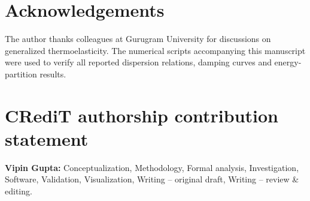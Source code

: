 \documentclass[review,12pt]{elsarticle}
\begin{document}
\label{sec:intro_ref}
\label{sec:history_ref}
\label{sec:foundations_ref}
\label{sec:prelim_ref}
\label{sec:kinetic_ref}
\label{sec:classical_ref}
\label{sec:hyperbolic_ref}
\label{sec:lags_ref}
\label{sec:delayfid_ref}
\label{sec:memory_ref}
\label{sec:fraccoupled_ref}
\label{sec:waves3d_ref}
\label{sec:aniso_ref}
\label{sec:reflection_ref}
\label{sec:transient_ref}
\label{sec:thermalmodes_ref}
\label{sec:surface_ref}
\label{sec:lamb_ref}
\label{sec:bar_ref}
\label{sec:flexted_ref}
\label{sec:interfaces_ref}
\label{sec:size_ref}
\label{sec:multi_ref}
\label{sec:bg_ref}
\label{sec:methods_ref}
\label{sec:schemes_ref}
\label{sec:applications_ref}
\label{sec:scenarios_ref}
\label{sec:examples_ref}
\label{sec:experiments_ref}
\label{sec:synthesis_ref}
\label{sec:reporting_ref}
\label{sec:open_ref}

\section*{Acknowledgements}
The author thanks colleagues at Gurugram University for discussions on generalized thermoelasticity. The numerical scripts accompanying this manuscript were used to verify all reported dispersion relations, damping curves and energy-partition results.

\section*{CRediT authorship contribution statement}
\textbf{Vipin Gupta:} Conceptualization, Methodology, Formal analysis, Investigation, Software, Validation, Visualization, Writing -- original draft, Writing -- review \& editing.
\end{document}
